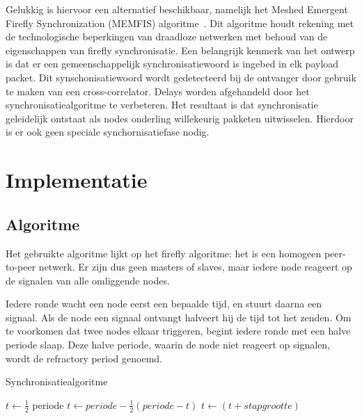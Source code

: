 \documentclass[a4paper,10pt]{article}
\begin{document}
Gelukkig is hiervoor een alternatief beschikbaar, namelijk het Meshed Emergent Firefly Synchronization (MEMFIS) algoritme~\cite{tyrrell2010emergent}. Dit algoritme houdt rekening met de technologische beperkingen van draadloze netwerken met behoud van de eigenschappen van firefly synchronisatie. Een belangrijk kenmerk van het ontwerp is dat er een gemeenschappelijk synchronisatiewoord is ingebed in elk payload packet. Dit synschonisatiewoord wordt gedetecteerd bij de ontvanger door gebruik te maken van een cross-correlator. Delays worden afgehandeld door het synchronisatiealgoritme te verbeteren. Het resultaat is dat synchronisatie geleidelijk ontstaat als nodes onderling willekeurig pakketen uitwisselen. Hierdoor is er ook geen speciale synchornisatiefase nodig.

\section{Implementatie}
\subsection{Algoritme}\label{sec:alg}
Het gebruikte algoritme lijkt op het firefly algoritme: het is een homogeen peer-to-peer netwerk. Er zijn dus geen masters of slaves, maar iedere node reageert op de signalen van alle omliggende nodes. 

Iedere ronde wacht een node eerst een bepaalde tijd, en stuurt daarna een signaal. Als de node een signaal ontvangt halveert hij de tijd tot het zenden. Om te voorkomen dat twee nodes elkaar triggeren, begint iedere ronde met een halve periode slaap. Deze halve periode, waarin de node niet reageert op signalen, wordt de refractory period genoemd.

\begin{algorithm}
    \caption{Synchronisatiealgoritme}
    \label{alg}
    \begin{algorithmic}
    \Loop
            \State {}
            \State {}
            \State $t \gets \frac{1}{2}$ periode
        \EndIf
            \State $t \gets periode - \frac{1}{2} (periode - t)$
        \Else
            \State {}
            \State $t \gets (t + stapgrootte)$
        \EndIf
    \EndLoop
    \end{algorithmic}
\end{algorithm}
\end{document}
